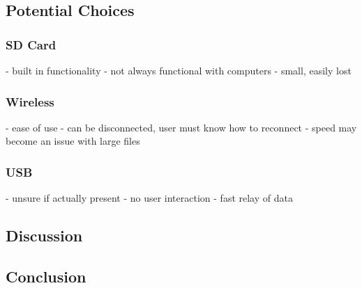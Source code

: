 \documentclass[onecolumn, draftclsnofoot,10pt, compsoc]{IEEEtran}
\begin{document}
	\subsection{Potential Choices}
		\subsubsection{SD Card}
		- built in functionality
		- not always functional with computers
		- small, easily lost
		\subsubsection{Wireless}
		- ease of use
		- can be disconnected, user must know how to reconnect
		- speed may become an issue with large files
		\subsubsection{USB}
		- unsure if actually present
		- no user interaction
		- fast relay of data
	\subsection{Discussion}
	\subsection{Conclusion}
\end{document}
